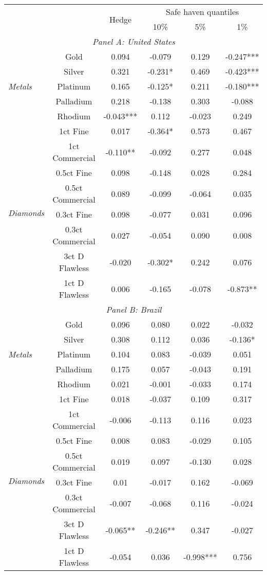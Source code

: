 \begin{tabularx}{1\textwidth}{Xccccc}
\toprule
 &    & \multirow{2}{*}{Hedge}  & \multicolumn{3}{c}{Safe haven quantiles} \\
\cmidrule(l{0.25em}){4-6} 
     &     &     & 10\% & 5\% & 1\% \\
\midrule
\multicolumn{6}{c}{\emph{Panel A: United States}} \\
\multirow{5}{*}{\emph{Metals}} & Gold & 0.094 & -0.079 & 0.129 & -0.247*** \\
& Silver & 0.321 & -0.231* & 0.469 & -0.423*** \\
& Platinum & 0.165 & -0.125* & 0.211 & -0.180*** \\
& Palladium & 0.218 & -0.138 & 0.303 & -0.088 \\
& Rhodium & -0.043*** & 0.112 & -0.023 & 0.249 \\
\midrule
\multirow{8}{*}{\emph{Diamonds}} & 1ct Fine & 0.017 & -0.364* & 0.573 & 0.467 \\
& 1ct Commercial & -0.110** & -0.092 & 0.277 & 0.048 \\
& 0.5ct Fine & 0.098 & -0.148 & 0.028 & 0.284 \\
& 0.5ct Commercial & 0.089 & -0.099 & -0.064 & 0.035 \\
& 0.3ct Fine & 0.098 & -0.077 & 0.031 & 0.096 \\
& 0.3ct Commercial & 0.027 & -0.054 & 0.090 & 0.008 \\
& 3ct D Flawless & -0.020 & -0.302* & 0.242 & 0.076 \\
& 1ct D Flawless & 0.006 & -0.165 & -0.078 & -0.873** \\
\midrule
\multicolumn{6}{c}{\emph{Panel B: Brazil}} \\
\multirow{5}{*}{\emph{Metals}} & Gold & 0.096 & 0.080 & 0.022 & -0.032 \\
& Silver & 0.308 & 0.112 & 0.036 & -0.136* \\
& Platinum & 0.104 & 0.083 & -0.039 & 0.051 \\
& Palladium & 0.175 & 0.057 & -0.043 & 0.191 \\
& Rhodium & 0.021 & -0.001 & -0.033 & 0.174 \\
\midrule
\multirow{8}{*}{\emph{Diamonds}} & 1ct Fine & 0.018 & -0.037 & 0.109 & 0.317 \\
& 1ct Commercial & -0.006 & -0.113 & 0.116 & 0.023 \\
& 0.5ct Fine & 0.008 & 0.083 & -0.029 & 0.105 \\
& 0.5ct Commercial & 0.019 & 0.097 & -0.130 & 0.028 \\
& 0.3ct Fine & 0.01 & -0.017 & 0.162 & -0.069 \\
& 0.3ct Commercial & -0.007 & -0.068 & 0.116 & -0.024 \\
& 3ct D Flawless & -0.065** & -0.246** & 0.347 & -0.027 \\
& 1ct D Flawless & -0.054 & 0.036 & -0.998*** & 0.756 \\
\bottomrule
\end{tabularx}